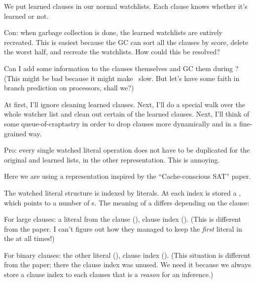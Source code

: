 We put learned clauses in our normal watchlists. Each clause knows
whether
it's learned or not.

\numberedlist

\li Con: when garbage collection is done, the learned watchlists are entirely
recreated. This is easiest because the GC can sort all the clauses by score,
delete the worst half, and recreate the watchlists. How could this be resolved?

\numberedlist

\li Can I add some information to the clauses themselves and GC them during
\BCP? (This might be bad because it might make \BCP\ slow. But let's have some
faith in branch prediction on processors, shall we?)

\li At first, I'll ignore cleaning learned clauses. Next, I'll do a special
walk over the whole watcher list and clean out certain of the learned
clauses. Next, I'll think of some queue-of-craptastry in order to drop clauses
more dynamically and in a fine-grained way.

\endnumberedlist

\li Pro: every single watched literal operation does not have to be duplicated
for the original and learned lists, in the other representation. This is
annoying.

\endnumberedlist

\fi

Here we are using a representation inspired by the ``Cache-conscious
SAT''
paper.

The watched literal structure is indexed by literals. At each index is stored a
, which points to a number of s. The
meaning of a
 differs depending on the clause:

\numberedlist

\li For large clauses: a literal from the clause (), clause index
(). (This is different from the paper. I can't figure out how they
managed to keep the {\it first} literal in the  at all
times!)

\li For binary clauses: the other literal (), clause index
(). (This situation is different from the paper; there the clause
index was unused. We need it because we always store a clause index to each
clauses that is a {\it reason} for an inference.)

